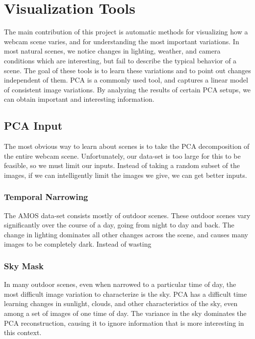 \chapter{Visualization Tools}
\label{cpt:tools}

The main contribution of this project is automatic methods for visualizing how a webcam scene varies, and for understanding the most important variations.  In most natural scenes, we notice changes in lighting, weather, and camera conditions which are interesting, but fail to describe the typical behavior of a scene.  The goal of these tools is to learn these variations and to point out changes independent of them.  PCA is a commonly used tool, and
captures a linear model of consistent image variations.  By analyzing the results of certain PCA setups, we can obtain important and interesting information.

\section{PCA Input}

The most obvious way to learn about scenes is to take the PCA decomposition of the entire webcam scene.  Unfortunately, our data-set is too large for this to be feasible, so we must limit our inputs.  Instead of taking a random subset of the images, if we can intelligently limit the images we give, we can get better inputs.

\subsection{Temporal Narrowing}

The AMOS data-set consists mostly of outdoor scenes.  These outdoor scenes vary significantly over the course of a day, going from night to day and back.  The change in lighting dominates all other changes across the scene, and causes many images to be completely dark.  Instead of wasting 

\subsection{Sky Mask}
In many outdoor scenes, even when narrowed to a particular time of day, the most difficult image
variation to characterize is the sky.  PCA has a difficult time learning changes in sunlight, clouds,
and other characteristics of the sky, even among a set of images of one time of day.  The variance in the sky dominates the PCA reconstruction, causing it to ignore information that is more interesting in this context.

